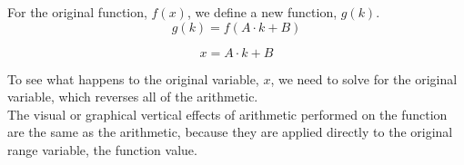 \documentclass{ximera}
\begin{document}
For the original function, $f(x)$, we define a new function, $g(k)$.
\[
g(k) = f(A \cdot k + B)
\]


\[
x = A \cdot k + B
\]



To see what happens to the original variable, $x$, we need to solve for the original variable, which reverses all of the arithmetic. \\




The visual or graphical vertical effects of arithmetic performed on the function are the same as the arithmetic, because they are applied directly to the original range variable, the function value.
\end{document}

